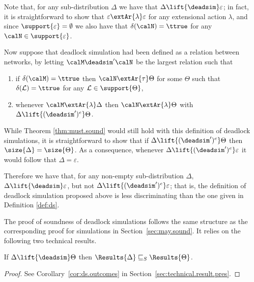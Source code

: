 \documentclass{LMCS}
\newcommand{\calL}{\ensuremath{{\mathcal{L}}}}
\begin{document}
\begin{remark}
Note that, for any sub-distribution $\Delta$ 
we have that $\Delta \lift{\deadsim} \varepsilon$; 
in fact, it is straightforward to show that 
$\varepsilon \extAr{\lambda} \varepsilon$ for 
any extensional action $\lambda$, and 
since $\support{\varepsilon} = \emptyset$ we 
also have that $\delta(\calN) = \ttrue$ 
for any $\calN \in \support{\varepsilon}$.

Now suppose that deadlock simulation had 
been defined as a relation between networks, 
by letting $\calM \deadsim' \calN$ be the largest 
relation such that 
\begin{enumerate}[label=(\roman*)] 
\item if $\delta(\calM) = \ttrue$ then $\calN \extAr{\tau} \Theta$ 
for some $\Theta$ such that $\delta(\calL) = \ttrue$ for any 
$\calL \in \support{\Theta}$, 
\item whenever $\calM \extAr{\lambda} \Delta$ then 
$\calN \extAr{\lambda} \Theta$ with $\Delta \lift{(\deadsim')^e} \Theta$. 
\end{enumerate}\medskip

\noindent While Theorem \ref{thm:must.sound} would still 
hold with this definition of deadlock simulations, 
it is straightforward to show that if 
$\Delta \lift{(\deadsim')^e} \Theta$ then $\size{\Delta} = 
\size{\Theta}$. As a consequence, whenever 
$\Delta \lift{(\deadsim')^e} \varepsilon$ it would 
follow that $\Delta = \varepsilon$. 

Therefore we have that, for any non-empty sub-distribution 
$\Delta$, $\Delta \lift{\deadsim} \varepsilon$, but not
$\Delta \lift{(\deadsim')^e} \varepsilon$;
that is, the definition of deadlock simulation proposed 
above is less discriminating than the one given in 
Definition \ref{def:ds}.
\end{remark} 


The proof of soundness of deadlock simulations follows the same structure as
the corresponding proof for simulations in Section~\ref{sec:may.sound}. It relies on
the following two technical results. 

\begin{thm}
\label{thm:ds.outcomes}
If $\Delta \lift{\deadsim} \Theta$ then 
$\Results{\Delta} \sqsubseteq_S \Results{\Theta}$. 
\end{thm}
\begin{proof}
  See Corollary~\ref{cor:ds.outcomes} in Section~\ref{sec:technical.result.pres}. 
\end{proof}
\end{document}
